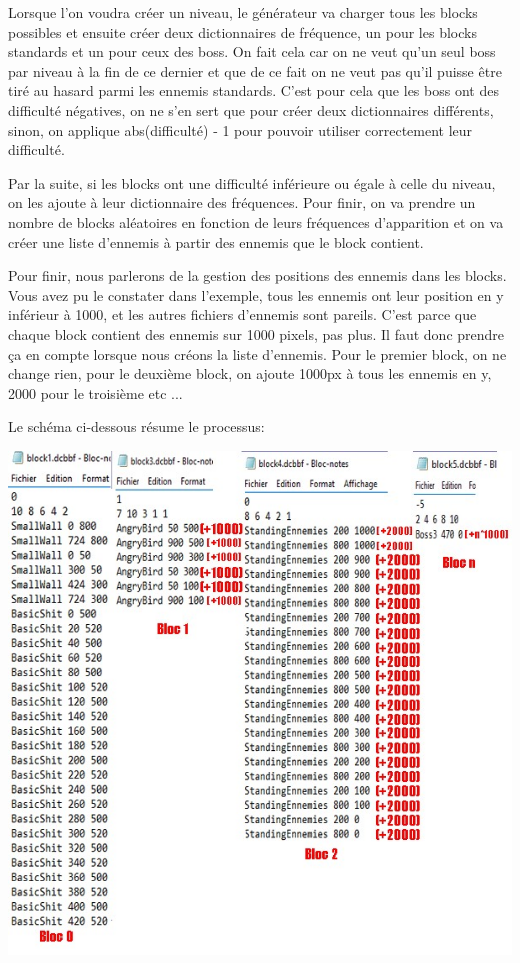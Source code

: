 \documentclass{article}
\begin{document}
Lorsque l'on voudra créer un niveau, le générateur va charger tous les blocks
possibles et ensuite créer deux dictionnaires de fréquence, un pour les blocks
standards et un pour ceux des boss. On fait cela car on ne veut qu'un seul boss
par niveau à la fin de ce dernier et que de ce fait on ne veut pas qu'il puisse
être tiré au hasard parmi les ennemis standards. C'est pour cela que les boss
ont des difficulté négatives, on ne s'en sert que pour créer deux dictionnaires
différents, sinon, on applique abs(difficulté) - 1 pour pouvoir utiliser
correctement leur difficulté.

Par la suite, si les blocks ont une difficulté inférieure ou égale à celle du
niveau, on les ajoute à leur dictionnaire des fréquences. Pour finir, on va
prendre un nombre de blocks aléatoires en fonction de leurs fréquences
d'apparition et on va créer une liste d'ennemis à partir des ennemis que le
block contient.

Pour finir, nous parlerons de la gestion des positions des ennemis dans les
blocks. Vous avez pu le constater dans l'exemple, tous les ennemis ont leur
position en y inférieur à 1000, et les autres fichiers d'ennemis sont pareils.
C'est parce que chaque block contient des ennemis sur 1000 pixels, pas plus. Il
faut donc prendre ça en compte lorsque nous créons la liste d'ennemis. Pour le
premier block, on ne change rien, pour le deuxième block, on ajoute 1000px à
tous les ennemis en y, 2000 pour le troisième etc ...

Le schéma ci-dessous résume le processus:

\begin{center}
\includegraphics[scale=0.75]{fichiers_rapport/images/explaindcbbf2.jpg}
\end{center}
\end{document}
